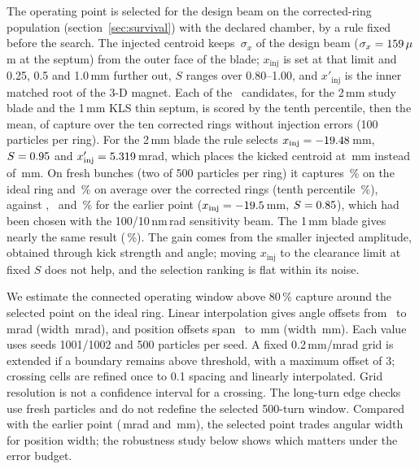 \documentclass[aps,prab,reprint,amsmath,amssymb,floatfix,longbibliography]{revtex4-2}
\begin{document}
The operating point is selected for the design beam on the corrected-ring population (section~\ref{sec:survival}) with the declared chamber, by a rule fixed before the search. The injected centroid keeps \RThreeClearSigma\,$\sigma_x$ of the design beam ($\sigma_x=159\,\mu$m at the septum) from the outer face of the blade; $x_\mathrm{inj}$ is set at that limit and 0.25, 0.5 and 1.0\,mm further out, $S$ ranges over 0.80--1.00, and $x'_\mathrm{inj}$ is the inner matched root of the 3-D magnet. Each of the \RThreeCandidates\ candidates, for the 2\,mm study blade and the 1\,mm KLS thin septum, is scored by the tenth percentile, then the mean, of capture over the ten corrected rings without injection errors (100 particles per ring). For the 2\,mm blade the rule selects $x_\mathrm{inj}=-19.48$\,mm, $S=0.95$ and $x'_\mathrm{inj}=5.319$\,mrad, which places the kicked centroid at \RThreeOpTwoCentroidMm\,mm instead of \OpCentroidMm\,mm. On fresh bunches (two of 500 particles per ring) it captures \RThreeValTwoNkmIdeal\,\% on the ideal ring and \RThreeValTwoNkmRingMean\,\% on average over the corrected rings (tenth percentile \RThreeValTwoNkmRingPten\,\%), against \RThreeValOldNkmIdeal, \RThreeValOldNkmRingMean\ and \RThreeValOldNkmRingPten\,\% for the earlier point ($x_\mathrm{inj}=-19.5$\,mm, $S=0.85$), which had been chosen with the 100/10\,nm\,rad sensitivity beam. The 1\,mm blade gives nearly the same result (\RThreeValOneNkmRingMean\,\%). The gain comes from the smaller injected amplitude, obtained through kick strength and angle; moving $x_\mathrm{inj}$ to the clearance limit at fixed $S$ does not help, and the selection ranking is flat within its noise.

We estimate the connected operating window above 80\,\% capture around the selected point on the ideal ring. Linear interpolation gives angle offsets from \FinalAngleLo\ to \FinalAngleHi\,mrad (width \FinalAngleWidth\,mrad), and position offsets span \FinalPositionLo\ to \FinalPositionHi\,mm (width \FinalPositionWidth\,mm). Each value uses seeds 1001/1002 and 500 particles per seed. A fixed 0.2\,mm/mrad grid is extended if a boundary remains above threshold, with a maximum offset of 3; crossing cells are refined once to 0.1 spacing and linearly interpolated. Grid resolution is not a confidence interval for a crossing. The long-turn edge checks use fresh particles and do not redefine the selected 500-turn window. Compared with the earlier point (\RThreeRefAngleWidth\,mrad and \RThreeRefPositionWidth\,mm), the selected point trades angular width for position width; the robustness study below shows which matters under the error budget.
\end{document}

